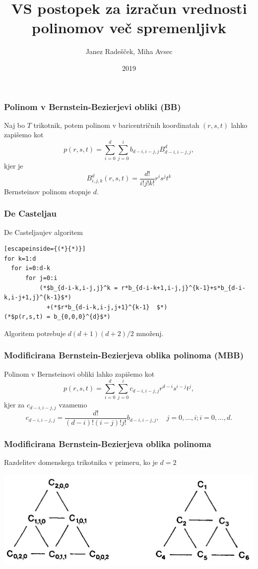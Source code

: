 \documentclass{beamer}
\title{VS postopek za izračun vrednosti polinomov več spremenljivk}
\author{Janez Radešček, Miha Avsec}
\institute{Fakulteta za matematiko in fiziko}
\date{2019}
\begin{document}
 
\frame{\titlepage}

\begin{frame}
\frametitle{Polinom v Bernstein-Bezierjevi obliki (BB)}
Naj bo $T$ trikotnik, potem polinom v baricentričnih koordinatah $(r,s,t)$ lahko zapišemo kot
$$p(r,s,t) = \sum_{i=0}^{d}\sum_{j=0}^{i}b_{d-i,i-j,j}B_{d-i,i-j,j}^{d},$$
kjer je
$$B_{i,j,k}^{d}(r,s,t) = \frac{d!}{i!j!k!}r^is^jt^k$$
Bernsteinov polinom stopnje $d$.

\end{frame}

\begin{frame}[fragile]
\frametitle{De Casteljau}
\begin{block}{De Casteljaujev algoritem}
\begin{lstlisting}[escapeinside={(*}{*)}]
for k=1:d
  for i=0:d-k
      for j=0:i
          (*$b_{d-i-k,i-j,j}^k = r*b_{d-i-k+1,i-j,j}^{k-1}+s*b_{d-i-k,i-j+1,j}^{k-1}$*) 
          	+(*$r*b_{d-i-k,i-j,j+1}^{k-1}  $*)
(*$p(r,s,t) = b_{0,0,0}^{d}$*)
\end{lstlisting}
\end{block}
Algoritem potrebuje $d(d+1)(d+2)/2$ množenj.
\end{frame}



\begin{frame}
\frametitle{Modificirana Bernstein-Bezierjeva oblika polinoma (MBB)}
Polinom v Bernsteinovi obliki lahko zapišemo kot
$$p(r,s,t) = \sum_{i=0}^{d}\sum_{j=0}^{i}c_{d-i,i-j,j}r^{d-i}s^{i-j}t^j,$$
kjer za $c_{d-i,i-j,j}$ vzamemo
$$c_{d-i,i-j,j} = \frac{d!}{(d-i)!(i-j)!j!}b_{d-i,i-j,j}, \quad j=0,\ldots, i; i = 0,\ldots,d.$$
\end{frame}


\begin{frame}
\frametitle{Modificirana Bernstein-Bezierjeva oblika polinoma}
Razdelitev domenskega trikotnika v primeru, ko je $d=2$
\begin{center}
\includegraphics[width=.9\linewidth]{graf.png}
\end{center}

\end{frame}
\end{document}
